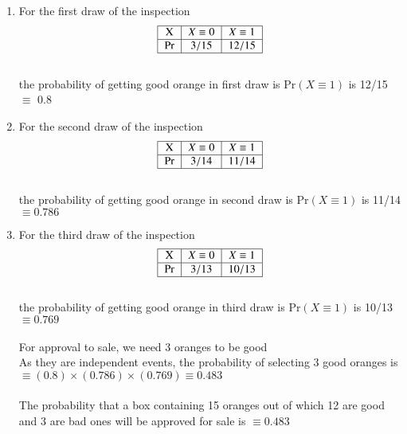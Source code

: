 \documentclass[journal,12pt,twocolumn]{IEEEtran}
\begin{document}
\begin{enumerate}
    
\item For the first draw of the inspection
\begin{align}
  \begin{tabular}{| c| c| c| }
  \hline
 X & $ X\equiv0$ & $X\equiv 1$\\ 
 \hline
Pr &$3/15$ & $12/15$ \\  
 \hline
\end{tabular}
\end{align}\\
the probability of getting good orange in first draw is Pr$(X\equiv1)$ is 12/15$ \equiv$ 0.8\

\item For the second draw of the inspection
\begin{align}
    \begin{tabular}{| c| c| c| }
  \hline
 X & $X\equiv0$ & $X\equiv1$\\ 
 \hline
Pr &$3/14$ & $11/14$ \\  
 \hline
\end{tabular}
\end{align}\\
the probability of getting good orange in second draw is Pr$(X\equiv1)$ is 11/14   $\equiv 0.786$

\item For the third draw of the inspection
\begin{align}
   \begin{tabular}{| c| c| c| }
  \hline
 X & $X\equiv0$ & $X \equiv1$\\ 
 \hline
Pr &$3/13$ & $10/13$ \\  
 \hline
\end{tabular}  
\end{align}\\
the probability of getting good orange in third draw is Pr$(X\equiv1)$ is 10/13  $\equiv0.769$ \\\\
For approval to sale, we need 3 oranges to be good\\
As they are independent events, the probability of selecting 3 good oranges is  $\equiv(0.8)\times(0.786)\times(0.769)\equiv0.483 $\\\\
The probability that a box containing 15 oranges out of which 12 are good and 3 are bad ones will be approved for sale is $\equiv 0.483 $
\end{enumerate}
\end{document}
